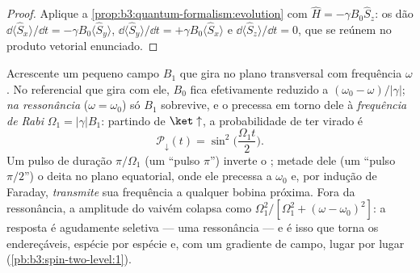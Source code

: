 \begin{proof}
Aplique a \cref{prop:b3:quantum-formalism:evolution} com $\hat H =
-\gamma B_0\hat S_z$: os  dão $\dd\langle\hat
S_x\rangle/\dd t = -\gamma B_0\langle\hat S_y\rangle$,
$\dd\langle\hat S_y\rangle/\dd t = +\gamma B_0\langle\hat
S_x\rangle$ e $\dd\langle\hat S_z\rangle/\dd t = 0$, que se
reúnem no produto vetorial enunciado.
\end{proof}

\begin{proposition}\label{prop:b3:spin-two-level:rabi}
Acrescente um pequeno campo $B_1$ que gira no plano transversal com
frequência $\omega$. No referencial que gira com ele, $B_0$ fica
efetivamente reduzido a $(\omega_0 - \omega)/|\gamma|$; \emph{na
ressonância} ($\omega = \omega_0$) só $B_1$ sobrevive, e o 
precessa em torno dele à \emph{frequência de Rabi} $\Omega_1 =
|\gamma|B_1$: partindo de $\ket\uparrow$, a probabilidade de ter virado
é
\[
\mathcal P_\downarrow(t) = \sin^2\Big(\frac{\Omega_1t}{2}\Big) .
\]
Um pulso de duração $\pi/\Omega_1$ (um ``pulso $\pi$'') inverte o ;
metade dele (um ``pulso $\pi/2$'') o deita no plano equatorial, onde
ele precessa a $\omega_0$ e, por indução de Faraday, \emph{transmite}
sua frequência a qualquer bobina próxima. Fora da ressonância, a
amplitude do vaivém colapsa como $\Omega_1^2/[\Omega_1^2 +
(\omega - \omega_0)^2]$: a resposta é agudamente seletiva --- uma
ressonância --- e é isso que torna os  endereçáveis, espécie por
espécie e, com um gradiente de campo, lugar por lugar
(\cref{pb:b3:spin-two-level:1}).
\end{proposition}
\admitted


